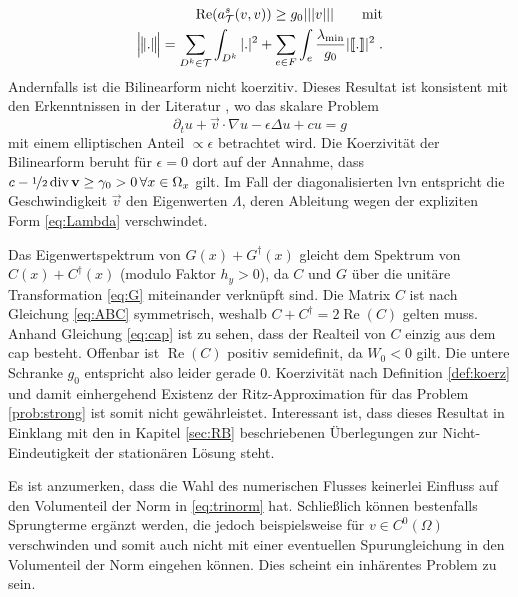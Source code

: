 \begin{align}
  \operatorname{Re}(a\fin^s(v, v)) \geq g_0 |||v||| \qquad \text{mit} \nonumber \\
  \trinorm{.} = \sum_{D^k\in\mathcal{T}}\int_{D^k} |.|^2 + \sum_{e\in F}\int_e  \frac{\lambda_{\text{min}}}{g_0} |\jump{.}|^2 \; . \label{eq:trinorm}
\end{align}
Andernfalls ist die Bilinearform nicht koerzitiv. Dieses Resultat ist konsistent mit den Erkenntnissen in der Literatur \cite{feistauer2007}, wo das skalare Problem
\begin{equation*}
  \partial_t u + \vec{v}\cdot \nabla u - \epsilon\Delta u + cu = g
\end{equation*}
mit einem elliptischen Anteil $\propto \epsilon$ betrachtet wird. Die Koerzivität der Bilinearform beruht für $\epsilon=0$ dort auf der Annahme, dass ${c-\nicefrac{1}{2}\,\text{div}\,\vec{v}\geq \gamma_0 > 0 \, \forall x\in\Omega_x}$ gilt. Im Fall der diagonalisierten \ac{lvn} entspricht die Geschwindigkeit $\vec{v}$ den Eigenwerten $\Lambda$, deren Ableitung wegen der expliziten Form \eqref{eq:Lambda} verschwindet.

Das Eigenwertspektrum von $G(x)+G^{\dagger}(x)$ gleicht dem Spektrum von $C(x)+C^{\dagger}(x)$ (modulo Faktor $h_y>0$), da $C$ und $G$ über die unitäre Transformation \eqref{eq:G} miteinander verknüpft sind. Die Matrix $C$ ist nach Gleichung \eqref{eq:ABC} symmetrisch, weshalb $C+C^{\dagger}=2\operatorname{Re}(C)$ gelten muss. Anhand Gleichung \eqref{eq:cap} ist zu sehen, dass der Realteil von $C$ einzig aus dem \ac{cap} besteht.
Offenbar ist $\operatorname{Re}(C)$ positiv semidefinit, da $W_0<0$ gilt. Die untere Schranke $g_0$ entspricht also leider gerade $0$. Koerzivität nach Definition \ref{def:koerz} und damit einhergehend Existenz der Ritz-Approximation für das Problem \ref{prob:strong} ist somit nicht gewährleistet. Interessant ist, dass dieses Resultat in Einklang mit den in Kapitel \ref{sec:RB} beschriebenen Überlegungen zur Nicht-Eindeutigkeit der stationären Lösung steht.

Es ist anzumerken, dass die Wahl des numerischen Flusses keinerlei Einfluss auf den Volumenteil der Norm in \eqref{eq:trinorm} hat. Schließlich können bestenfalls Sprungterme  ergänzt werden, die jedoch beispielsweise für $v\in C^0(\Omega)$ verschwinden und somit auch nicht mit einer eventuellen Spurungleichung in den Volumenteil der Norm eingehen können. Dies scheint ein inhärentes Problem zu sein.


